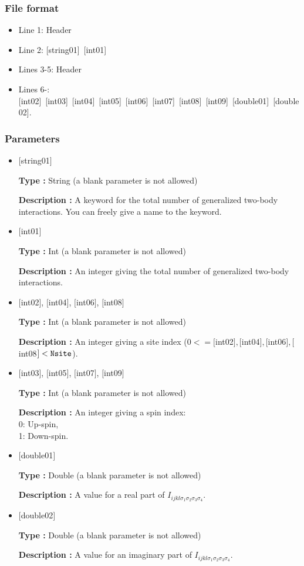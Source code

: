 \subsubsection{File format}
 \begin{itemize}
   \item  Line 1:  Header
   \item  Line 2:   [string01]~[int01]
   \item  Lines 3-5:  Header
   \item  Lines 6-:
   [int02]~[int03]~[int04]~[int05]~[int06]~[int07]~[int08]~[int09]~[double01]~[double02].
  \end{itemize}
\subsubsection{Parameters}
 \begin{itemize}

   \item  $[$string01$]$
   
    {\bf Type :} String (a blank parameter is not allowed)

   {\bf Description :} A keyword for the total number of generalized two-body interactions. You can freely give a name to the keyword.

   \item  $[$int01$]$
   
    {\bf Type :} Int (a blank parameter is not allowed)

   {\bf Description :} An integer giving the total number of generalized two-body interactions.

  \item  $[$int02$]$, $[$int04$]$, $[$int06$]$, $[$int08$]$

 {\bf Type :} Int (a blank parameter is not allowed)

{\bf Description :} An integer giving a site index ($0<= [$int02$],  [$int04$], [$int06$], [$int08$]<\verb|Nsite|$).
 
  \item  $[$int03$]$, $[$int05$]$, $[$int07$]$, $[$int09$]$

 {\bf Type :} Int (a blank parameter is not allowed)

{\bf Description :}  An integer giving a spin index:\\
0: Up-spin,\\
1: Down-spin.

 \item  $[$double01$]$
   
   {\bf Type :} Double (a blank parameter is not allowed)

  {\bf Description :}  A value for a real part of $I_{ijkl\sigma_1\sigma_2\sigma_3\sigma_4}$.

 \item  $[$double02$]$
   
   {\bf Type :} Double (a blank parameter is not allowed)

  {\bf Description :} A value for an imaginary part of $I_{ijkl\sigma_1\sigma_2\sigma_3\sigma_4}$.
\end{itemize}

